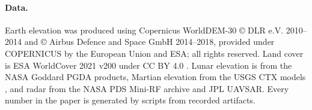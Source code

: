 \paragraph{Data.} Earth elevation was produced using Copernicus WorldDEM-30
\copyright{} DLR e.V. 2010--2014 and \copyright{} Airbus Defence and Space GmbH 2014--2018,
provided under COPERNICUS by the European Union and ESA; all rights reserved. Land cover is ESA
WorldCover 2021 v200 under CC BY 4.0 \citep{zanaga2022}. Lunar elevation is from the NASA Goddard
PGDA products, Martian elevation from the USGS CTX models \citep{laura2021}, and radar from the
NASA PDS Mini-RF archive and JPL UAVSAR. Every number in the paper is generated by scripts from
recorded artifacts.
